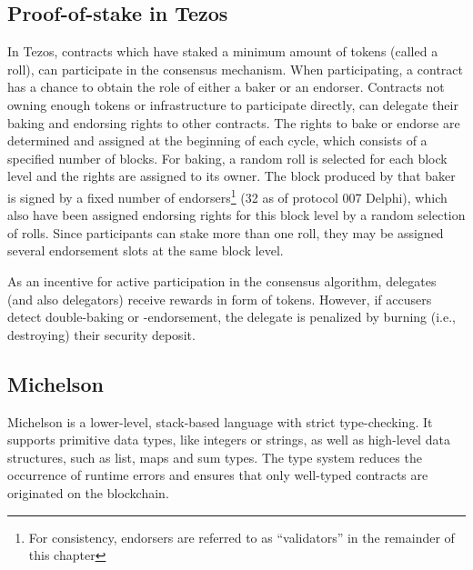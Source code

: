 \subsection{Proof-of-stake in Tezos}
In Tezos, contracts which have staked a minimum amount of tokens (called a roll), can participate in the consensus mechanism. When participating, a contract has a chance to obtain the role of either a baker or an endorser. Contracts not owning enough tokens or infrastructure to participate directly, can delegate their baking and endorsing rights to other contracts. The rights to bake or endorse are determined and assigned at the beginning of each cycle, which consists of a specified number of blocks. For baking, a random roll is selected for each block level and the rights are assigned to its owner. The block produced by that baker is signed by a fixed number of endorsers\footnote{For consistency, endorsers are referred to as ``validators'' in the remainder of this chapter} (32 as of protocol 007 Delphi), which also have been assigned endorsing rights for this block level by a random selection of rolls. Since participants can stake more than one roll, they may be assigned several endorsement slots at the same block level.

As an incentive for active participation in the consensus algorithm, delegates (and also delegators) receive rewards in form of tokens. However, if accusers detect double-baking or -endorsement, the delegate is penalized by burning (i.e., destroying) their security deposit.

\subsection{Michelson}
Michelson is a lower-level, stack-based language with strict type-checking. It supports primitive data types, like integers or strings, as well as high-level data structures, such as list, maps and sum types. The type system reduces the occurrence of runtime errors and ensures that only well-typed contracts are originated on the blockchain.


